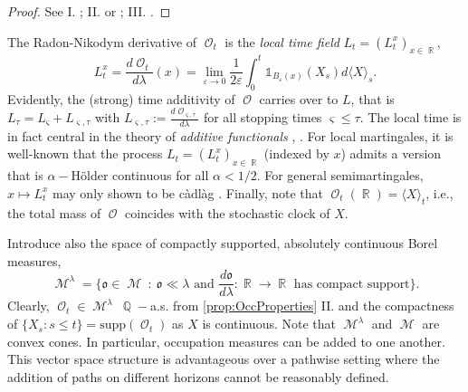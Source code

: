 \documentclass[11pt]{article}
\def\mo{\mathfrak{o}}
\theoremstyle{plain}
\theoremstyle{definition}
\DeclareMathOperator{\Q}{\mathbb{Q}}
\DeclareMathOperator{\R}{\mathbb{R}}
\DeclareMathOperator{\calM}{\mathcal{M}}
\DeclareMathOperator{\calO}{\mathcal{O}}
\begin{document}
\begin{proof}
See I. \cite[X]{RevuzYor}; II.  \cite[VI]{RevuzYor} or \cite{GemanHorowitz}; III. \cite[VI]{RevuzYor}.
\end{proof}
The Radon-Nikodym derivative of $\calO_t$ is the  \textit{local time field}  $L_t = (L_t^x)_{x\in \R} $, 
\begin{equation}\label{eq:LTdef}
     L_t^x = \frac{d\calO_t}{d\lambda}(x) =   \lim_{\varepsilon\to 0} \frac{1}{2\varepsilon}\int_0^t\mathds{1}_{B_{\varepsilon}(x)}(X_s) d\langle X \rangle_s. 
\end{equation} 
Evidently, the (strong) time additivity of $\calO$  carries over to $L$, that is $
    L_\tau = L_{\varsigma} + L_{\varsigma,\tau}$ with $L_{\varsigma,\tau} := \frac{d\calO_{\varsigma,\tau}}{d\lambda}$ for all stopping times $\varsigma \le \tau$.
 The local time 
 is in fact central 
in the theory of \textit{additive functionals}   \cite{BlumenthalGetoor}, \cite[Chapter X]{RevuzYor}. 
For local martingales,  it is well-known that the process $L_t= (L_t^x)_{x\in \R}$  
(indexed by $x$) 
admits a version that is  $\alpha-$H\"older continuous for all $\alpha <1/2$. For general semimartingales,  $x\mapsto L_t^x$ may only shown to be càdlàg \cite[Chapter VI]{RevuzYor}.  
Finally, note that  $\calO_t(\R) = \langle X \rangle_t$, i.e.,  the total mass of  $\calO$ coincides with the stochastic clock of $X$. 
 
Introduce also the space of compactly supported,   absolutely continuous Borel measures, 
\begin{equation}\label{eq:M}
     \calM^{\lambda} = \big\{\mo \in \calM \ : \ \mo \ll \lambda \text{ and }  \frac{d\mo}{d\lambda}:\R\to \R \text{ has compact support} \big\}.
\end{equation}
 Clearly,  $\calO_t \in \calM^{\lambda} \ \Q-$a.s. from \cref{prop:OccProperties} II. and  the compactness of $\{X_s :s\le t\}=\text{supp}(\calO_t)$  
 as $X$ is continuous.  
Note that $\calM^{\lambda}$ and  $\calM$ are convex cones. 
In particular, occupation measures can be  added to one another. 
This vector space structure  is 
 advantageous over  
a pathwise setting 
where the addition of  paths on different horizons cannot be reasonably defined. 
\end{document}
